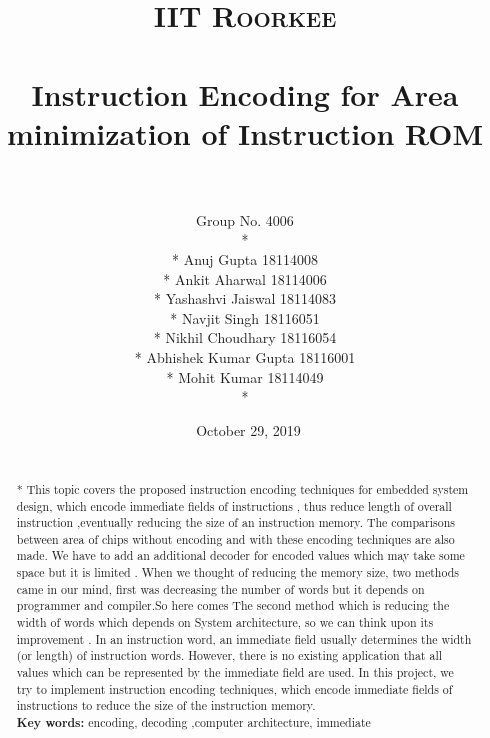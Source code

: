 \documentclass[paper=a4, fontsize=11pt]{scrartcl} %
\title{	
\normalfont \normalsize 
\textsc{IIT Roorkee} \\ [25pt] %
\horrule{0.5pt} \\[0.4cm] %
\huge  Instruction Encoding for Area minimization of Instruction ROM \\ %
\horrule{2pt} \\[0.5cm] %
}
\author{Group No. 4006\\* \\* Anuj Gupta        18114008 \\* Ankit Aharwal      18114006\\* Yashashvi Jaiswal      18114083\\* Navjit Singh      18116051\\* Nikhil Choudhary   18116054\\* Abhishek Kumar Gupta  18116001\\* Mohit Kumar      18114049\\*} %
\date{\normalsize\ October 29, 2019}
\numberwithin{equation}{section} %
\numberwithin{figure}{section} %
\numberwithin{table}{section} %
\begin{document}
\maketitle %

\newpage
\begin{abstract}

{ }
\\*
This topic covers the proposed instruction encoding techniques for embedded system design, which encode immediate fields of instructions , thus reduce length of overall instruction ,eventually reducing the size of an instruction memory. The comparisons between area of chips without encoding and with these encoding techniques are also made. We have to add an additional decoder for encoded values which may take some space but it is limited . When we thought of reducing the memory size, two methods came in our mind, first was decreasing the number of words but it depends on programmer and compiler.So here comes  The second method which is reducing the width of words which depends on System architecture, so we can think upon its improvement . In an instruction word, an immediate field usually determines the width (or length) of instruction words. However, there is no existing application that all values which can be represented by the immediate field are used. In this project, we try to implement instruction encoding techniques, which encode immediate fields of instructions to reduce the size of the instruction memory.
  \\


\textbf{Key words:} encoding, decoding ,computer architecture, immediate
\end{abstract}
\end{document}
